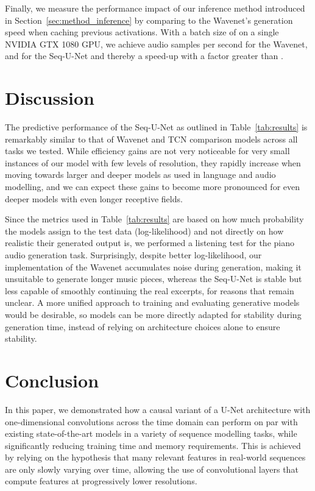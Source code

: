 \documentclass{article}
\begin{document}
Finally, we measure the performance impact of our inference method introduced in Section~\ref{sec:method_inference} by comparing to the Wavenet's generation speed when caching previous activations.
With a batch size of  on a single NVIDIA GTX 1080 GPU, we achieve  audio samples per second for the Wavenet, and  for the Seq-U-Net and thereby a speed-up with a factor greater than .

\section{Discussion}

The predictive performance of the Seq-U-Net as outlined in Table~\ref{tab:results} is remarkably similar to that of Wavenet and TCN comparison models across all tasks we tested.
While efficiency gains are not very noticeable for very small instances of our model with few levels of resolution, they rapidly increase when moving towards larger and deeper models as used in language and audio modelling, and we can expect these gains to become more pronounced for even deeper models with even longer receptive fields.

Since the metrics used in Table~\ref{tab:results} are based on how much probability the models assign to the test data (log-likelihood) and not directly on how realistic their generated output is, we performed a listening test for the piano audio generation task.
Surprisingly, despite better log-likelihood, our implementation of the Wavenet accumulates noise during generation, making it unsuitable to generate longer music pieces, whereas the Seq-U-Net is stable but less capable of smoothly continuing the real excerpts, for reasons that remain unclear.
A more unified approach to training and evaluating generative models would be desirable, so models can be more directly adapted for stability during generation time, instead of relying on architecture choices alone to ensure stability.

\section{Conclusion}

In this paper, we demonstrated how a causal variant of a U-Net architecture with one-dimensional convolutions across the time domain can perform on par with existing state-of-the-art models in a variety of sequence modelling tasks, while significantly reducing training time and memory requirements.
This is achieved by relying on the hypothesis that many relevant features in real-world sequences are only slowly varying over time, allowing the use of convolutional layers that compute features at progressively lower resolutions.
\end{document}
